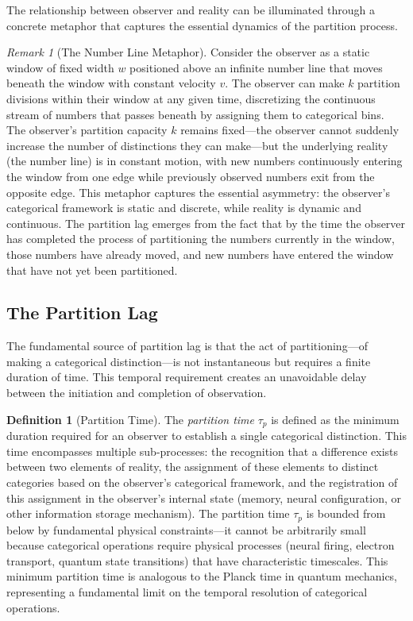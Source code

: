 \documentclass[12pt,a4paper]{article}
\theoremstyle{definition}
\newtheorem{definition}[theorem]{Definition}
\theoremstyle{remark}
\newtheorem{remark}[theorem]{Remark}
\begin{document}
The relationship between observer and reality can be illuminated through a concrete metaphor that captures the essential dynamics of the partition process.

\begin{remark}[The Number Line Metaphor]
\label{rem:number_line}
Consider the observer as a static window of fixed width $w$ positioned above an infinite number line that moves beneath the window with constant velocity $v$. The observer can make $k$ partition divisions within their window at any given time, discretizing the continuous stream of numbers that passes beneath by assigning them to categorical bins. The observer's partition capacity $k$ remains fixed—the observer cannot suddenly increase the number of distinctions they can make—but the underlying reality (the number line) is in constant motion, with new numbers continuously entering the window from one edge while previously observed numbers exit from the opposite edge. This metaphor captures the essential asymmetry: the observer's categorical framework is static and discrete, while reality is dynamic and continuous. The partition lag emerges from the fact that by the time the observer has completed the process of partitioning the numbers currently in the window, those numbers have already moved, and new numbers have entered the window that have not yet been partitioned.
\end{remark}

\subsection{The Partition Lag}

The fundamental source of partition lag is that the act of partitioning—of making a categorical distinction—is not instantaneous but requires a finite duration of time. This temporal requirement creates an unavoidable delay between the initiation and completion of observation.

\begin{definition}[Partition Time]
\label{def:partition_time}
The \emph{partition time} $\tau_p$ is defined as the minimum duration required for an observer to establish a single categorical distinction. This time encompasses multiple sub-processes: the recognition that a difference exists between two elements of reality, the assignment of these elements to distinct categories based on the observer's categorical framework, and the registration of this assignment in the observer's internal state (memory, neural configuration, or other information storage mechanism). The partition time $\tau_p$ is bounded from below by fundamental physical constraints—it cannot be arbitrarily small because categorical operations require physical processes (neural firing, electron transport, quantum state transitions) that have characteristic timescales. This minimum partition time is analogous to the Planck time in quantum mechanics, representing a fundamental limit on the temporal resolution of categorical operations.
\end{definition}
\end{document}
